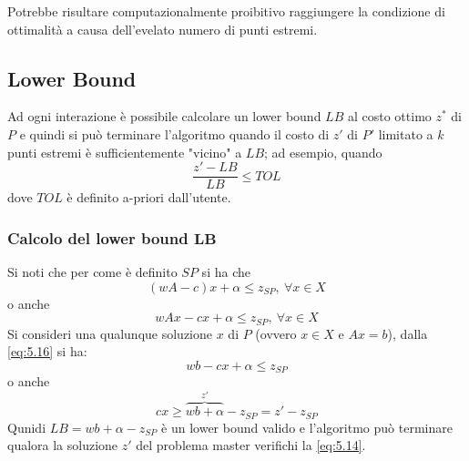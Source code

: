 Potrebbe risultare computazionalmente proibitivo raggiungere la condizione di ottimalità a causa dell'evelato numero di punti estremi.

\subsection{Lower Bound}
Ad ogni interazione è possibile calcolare un lower bound $LB$ al costo ottimo $z^{*}$ di $P$ e quindi si può terminare l'algoritmo quando il costo di $z'$ di $P'$ limitato a $k$ punti estremi è sufficientemente "vicino" a $LB$; ad esempio, quando
\begin{equation}
	\frac{z'-LB}{LB}\le TOL \label{eq:5.14}
\end{equation}
dove $TOL$ è definito a-priori dall'utente.
\subsubsection{Calcolo del lower bound $\boldsymbol{LB}$}
Si noti che per come è definito $SP$ si ha che
\begin{equation}
	(w A-c)x+\alpha\le z_{SP},\ \forall x\in X
\end{equation}
o anche
\begin{equation}
	w Ax-cx+\alpha\le z_{SP}, \ \forall x\in X \label{eq:5.16}
\end{equation}
Si consideri una qualunque soluzione $x$ di $P$ (ovvero $x\in X$ e $Ax=b$), dalla \ref{eq:5.16} si ha:
\begin{equation}
	w b-cx+\alpha\le z_{SP}
\end{equation}
o anche
\begin{equation}
	cx\ge\overbrace{w b+\alpha}^{z'}-z_{SP}=z'-z_{SP}
\end{equation}
Qunidi $LB=w b+\alpha-z_{SP}$ è un lower bound valido e l'algoritmo può terminare qualora la soluzione $z'$ del problema master verifichi la \ref{eq:5.14}.

